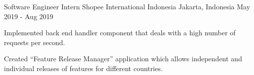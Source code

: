 \begin{cventries}
\cventry
{Software Engineer Intern} %
{Shopee International Indonesia} %
{Jakarta, Indonesia} %
{May 2019 - Aug 2019} %
{
	\begin{cvitems} %
		\item {Implemented back end handler component that deals with a high number of requests per second.}
		\item {Created ``Feature Release Manager'' application which allows independent and individual releases of features for different countries.}
	\end{cvitems}
}



\end{cventries}
